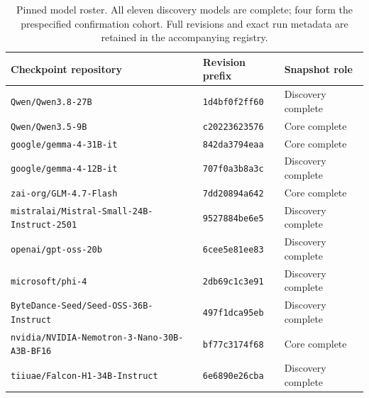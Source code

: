 \begin{table}[t]
\centering\small
\begin{lrbox}{\OCtable}\begin{tabular}{@{}lll@{}}
\toprule
Checkpoint repository & Revision prefix & Snapshot role\\
\midrule
\texttt{Qwen/Qwen3.8-27B} & \texttt{1d4bf0f2ff60} & Discovery complete\\
\texttt{Qwen/Qwen3.5-9B} & \texttt{c20223623576} & Core complete\\
\texttt{google/gemma-4-31B-it} & \texttt{842da3794eaa} & Core complete\\
\texttt{google/gemma-4-12B-it} & \texttt{707f0a3b8a3c} & Discovery complete\\
\texttt{zai-org/GLM-4.7-Flash} & \texttt{7dd20894a642} & Core complete\\
\texttt{mistralai/Mistral-Small-24B-Instruct-2501} & \texttt{9527884be6e5} & Discovery complete\\
\texttt{openai/gpt-oss-20b} & \texttt{6cee5e81ee83} & Discovery complete\\
\texttt{microsoft/phi-4} & \texttt{2db69c1c3e91} & Discovery complete\\
\texttt{ByteDance-Seed/Seed-OSS-36B-Instruct} & \texttt{497f1dca95eb} & Discovery complete\\
\texttt{nvidia/NVIDIA-Nemotron-3-Nano-30B-A3B-BF16} & \texttt{bf77c3174f68} & Core complete\\
\texttt{tiiuae/Falcon-H1-34B-Instruct} & \texttt{6e6890e26cba} & Discovery complete\\
\bottomrule
\end{tabular}\end{lrbox}
\ifdim\wd\OCtable>\linewidth\PackageError{access-paper}{Table tab:roster exceeds its column}{Revise the table layout.}\fi
\usebox{\OCtable}
\caption{Pinned model roster. All eleven discovery models are complete; four form the prespecified confirmation cohort. Full revisions and exact run metadata are retained in the accompanying registry.}
\label{tab:roster}
\end{table}

